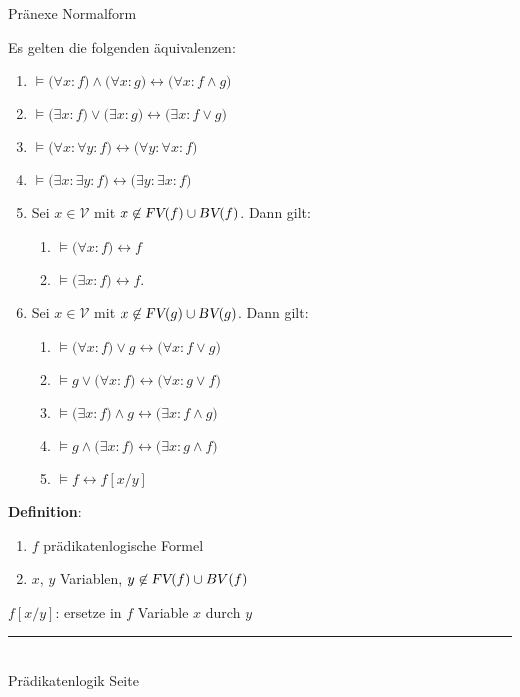 \documentclass{slides}
\newcommand{\myrule}{\rule{20cm}{1mm}\\ }
\newcommand{\FV}{\textsl{FV}}
\newcommand{\BV}{\textsl{BV}}
\newcounter{mypage}
\begin{document}

\begin{slide}{}
\normalsize
\begin{center}
Pr\"{a}nexe Normalform
\end{center}
\vspace{0.5cm}

\footnotesize
Es gelten die folgenden \"{a}quivalenzen:
  \begin{enumerate}
  \item $\models \big(\forall x\colon f\big) \wedge \big(\forall x\colon g\big) \leftrightarrow \big(\forall x\colon f \wedge g\big)$
  \item $\models \big(\exists x\colon f\big) \vee \big(\exists x\colon g\big) \leftrightarrow \big(\exists x\colon f \vee g\big)$
  \item $\models \big(\forall x\colon \forall y\colon f \big) \leftrightarrow \big(\forall y\colon  \forall x\colon f \big)$
  \item $\models \big(\exists x\colon \exists y\colon f \big) \leftrightarrow \big(\exists y\colon  \exists x\colon f \big)$
  \item Sei $x \in \mathcal{V}$ mit $x \not\in \FV(f) \cup \BV(f)$. Dann gilt:
    \begin{enumerate}
    \item $\models  \big(\forall x\colon f) \leftrightarrow f$ 
    \item $\models  \big(\exists x\colon f) \leftrightarrow f$.
    \end{enumerate}
  \item Sei $x \in \mathcal{V}$ mit $x \not\in \FV(g) \cup \BV(g)$. Dann gilt:
    \begin{enumerate}
    \item $\models \big(\forall x\colon f) \vee g \leftrightarrow \big(\forall x\colon f \vee g\big)$
    \item $\models g \vee \big(\forall x\colon f) \leftrightarrow \big(\forall x\colon g \vee f\big)$
    \item $\models \big(\exists x\colon f) \wedge g \leftrightarrow \big(\exists x\colon f \wedge g\big)$
    \item $\models g \wedge \big(\exists x\colon f) \leftrightarrow \big(\exists x\colon g \wedge f\big)$
    \item $\models f \leftrightarrow f[x/y]$
    \end{enumerate}
  \end{enumerate}

\textbf{Definition}: 
\begin{enumerate}
\item  $f$  pr\"{a}dikatenlogische Formel
\item $x$, $y$ Variablen, $y \not\in \FV(f) \cup BV(f)$
\end{enumerate} 
\qquad  $f[x/y]$: ersetze in $f$ Variable  $x$ durch $y$ 


\vspace*{\fill}
\tiny \addtocounter{mypage}{1}
\myrule
Pr\"{a}dikatenlogik   \hspace*{\fill} Seite 
\end{slide}
\end{document}
